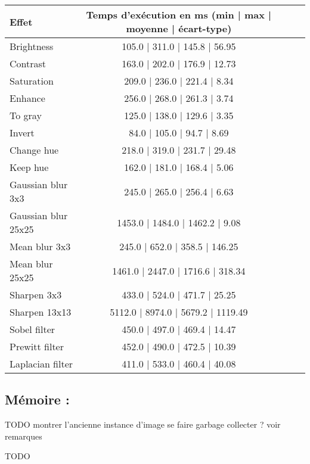 \begin{tabular}{||l||c|c||c|c||}
    \hline
    \hline
    \textbf{Effet} & \textbf{Temps d'exécution en ms} (min | max | moyenne | écart-type)\\
    \hline
    \hline
    Brightness & 105.0 | 311.0 | 145.8 | 56.95\\
    \hline
    Contrast & 163.0 | 202.0 | 176.9 | 12.73\\
    \hline
    Saturation & 209.0 | 236.0 | 221.4 | 8.34\\
    \hline
    Enhance & 256.0 | 268.0 | 261.3 | 3.74\\
    \hline
    To gray & 125.0 | 138.0 | 129.6 | 3.35\\
    \hline
    Invert & 84.0 | 105.0 | 94.7 | 8.69\\
    \hline
    Change hue & 218.0 | 319.0 | 231.7 | 29.48\\
    \hline
    Keep hue & 162.0 | 181.0 | 168.4 | 5.06\\
    \hline
    Gaussian blur 3x3 & 245.0 | 265.0 | 256.4 | 6.63\\
    \hline
    Gaussian blur 25x25 & 1453.0 | 1484.0 | 1462.2 | 9.08\\
    \hline
    Mean blur 3x3 & 245.0 | 652.0 | 358.5 | 146.25\\
    \hline
    Mean blur 25x25 & 1461.0 | 2447.0 | 1716.6 | 318.34\\
    \hline
    Sharpen 3x3 & 433.0 | 524.0 | 471.7 | 25.25\\
    \hline
    Sharpen 13x13 & 5112.0 | 8974.0 | 5679.2 | 1119.49\\
    \hline
    Sobel filter & 450.0 | 497.0 | 469.4 | 14.47\\
    \hline
    Prewitt filter & 452.0 | 490.0 | 472.5 | 10.39\\
    \hline
    Laplacian filter & 411.0 | 533.0 | 460.4 | 40.08\\
    \hline
    \hline
  \end{tabular}

\subsection{Mémoire :}
TODO montrer l'ancienne instance d'image se faire garbage collecter ? voir remarques

TODO